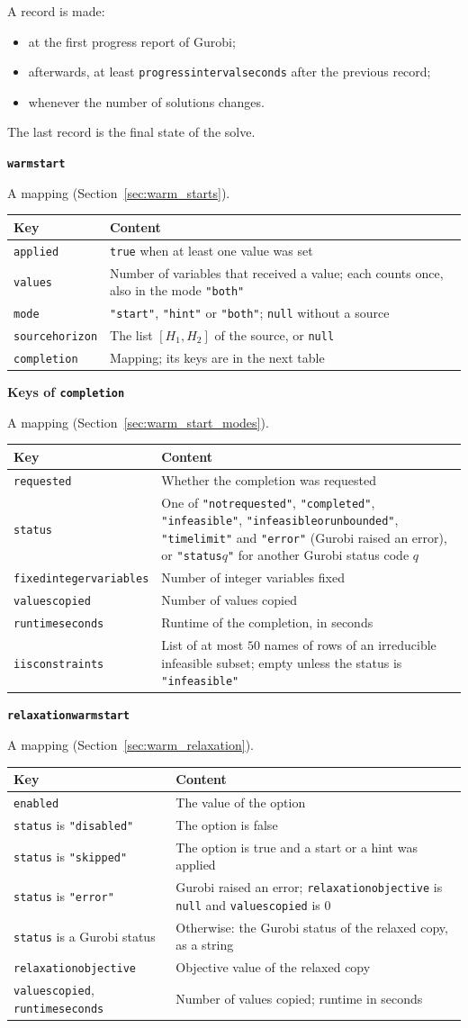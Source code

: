 \documentclass[11pt,a4paper]{article}
\makeatletter
\theoremstyle{plain}
\theoremstyle{definition}
\newcommand{\blockhead}[1]{\par\noindent\textbf{#1}\par\nobreak}
\renewcommand{\_}{\textunderscore\allowbreak{}}
\providecommand{\rejrow}[2]{{\raggedright #1\par} & {\raggedright #2\par} \\}
\providecommand{\tabstart}[2]{\begingroup\small\begin{longtable}{@{}#1@{}}\toprule #2 \\ \midrule \endhead}
\providecommand{\tabend}{\bottomrule\end{longtable}\endgroup}
\makeatother
\begin{document}
A record is made:
\begin{itemize}[nosep,leftmargin=1.5em]
  \item at the first progress report of Gurobi;
  \item afterwards, at least \texttt{progress\_interval\_seconds} after the previous record;
  \item whenever the number of solutions changes.
\end{itemize}
The last record is the final state of the solve.

\blockhead{\texttt{warm\_start}}
A mapping (Section~\ref{sec:warm_starts}).

\tabstart{p{5.2cm}p{9.8cm}}{Key & Content}
\rejrow{\texttt{applied}}{\texttt{true} when at least one value was set}
\rejrow{\texttt{values}}{Number of variables that received a value; each counts once, also in the mode \texttt{"both"}}
\rejrow{\texttt{mode}}{\texttt{"start"}, \texttt{"hint"} or \texttt{"both"}; \texttt{null} without a source}
\rejrow{\texttt{source\_horizon}}{The list $[H_1, H_2]$ of the source, or \texttt{null}}
\rejrow{\texttt{completion}}{Mapping; its keys are in the next table}
\tabend

\blockhead{Keys of \texttt{completion}}
A mapping (Section~\ref{sec:warm_start_modes}).

\tabstart{p{4.3cm}p{10.7cm}}{Key & Content}
\rejrow{\texttt{requested}}{Whether the completion was requested}
\rejrow{\texttt{status}}{One of \texttt{"not\_requested"}, \texttt{"completed"}, \texttt{"infeasible"}, \texttt{"infeasible\_or\_unbounded"}, \texttt{"time\_limit"} and \texttt{"error"} (Gurobi raised an error), or \texttt{"status\_}$q$\texttt{"} for another Gurobi status code $q$}
\rejrow{\texttt{fixed\_integer\_variables}}{Number of integer variables fixed}
\rejrow{\texttt{values\_copied}}{Number of values copied}
\rejrow{\texttt{runtime\_seconds}}{Runtime of the completion, in seconds}
\rejrow{\texttt{iis\_constraints}}{List of at most $50$ names of rows of an irreducible infeasible subset; empty unless the status is \texttt{"infeasible"}}
\tabend

\blockhead{\texttt{relaxation\_warm\_start}}
A mapping (Section~\ref{sec:warm_relaxation}).

\tabstart{p{5.2cm}p{9.8cm}}{Key & Content}
\rejrow{\texttt{enabled}}{The value of the option}
\rejrow{\texttt{status} is \texttt{"disabled"}}{The option is false}
\rejrow{\texttt{status} is \texttt{"skipped"}}{The option is true and a start or a hint was applied}
\rejrow{\texttt{status} is \texttt{"error"}}{Gurobi raised an error; \texttt{relaxation\_objective} is \texttt{null} and \texttt{values\_copied} is $0$}
\rejrow{\texttt{status} is a Gurobi status}{Otherwise: the Gurobi status of the relaxed copy, as a string}
\rejrow{\texttt{relaxation\_objective}}{Objective value of the relaxed copy}
\rejrow{\texttt{values\_copied}, \texttt{runtime\_seconds}}{Number of values copied; runtime in seconds}
\tabend
\end{document}
